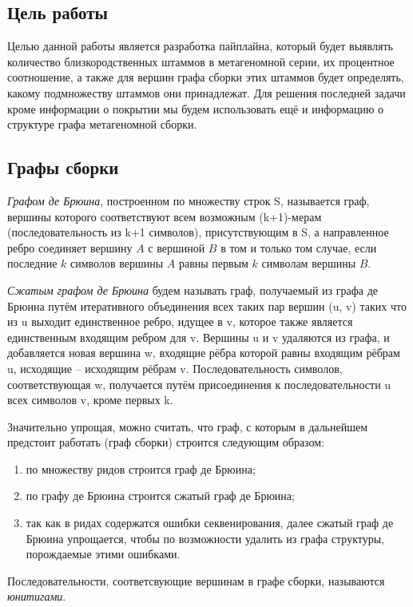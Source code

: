 \documentclass{spbau-diploma}
\begin{document}
\subsection{Цель работы}
Целью данной работы является разработка пайплайна, который будет выявлять количество близкородственных штаммов в метагеномной серии, их процентное соотношение, а также для вершин графа сборки этих штаммов будет определять, какому подмножеству штаммов они принадлежат. 
Для решения последней задачи кроме информации о покрытии мы будем использовать ещё и информацию о структуре графа метагеномной сборки. 

\subsection{Графы сборки}

\textit{Графом де Брюина}, построенном по множеству строк S, называется граф, вершины которого соответствуют всем возможным (k+1)-мерам (последовательность из k+1 символов), присутствующим в S, а направленное ребро соединяет вершину $A$ с вершиной $B$ в том и только том случае, если последние $k$ символов вершины $A$ равны первым $k$ символам вершины $B$.

\textit{Сжатым графом де Брюина} будем называть граф, получаемый из графа де Брюина путём итеративного объединения всех таких пар вершин (u, v) таких что из u выходит единственное ребро, идущее в v, которое также является единственным входящим ребром для v. Вершины u и v удаляются из графа, и добавляется новая вершина w, входящие рёбра которой равны входящим рёбрам u, исходящие -- исходящим рёбрам v. Последовательность символов, соответствующая w, получается путём присоединения к последовательности u всех символов v, кроме первых k.

Значительно упрощая, можно считать, что граф, с которым в дальнейшем предстоит работать (граф сборки) строится 
следующим образом:
\begin{enumerate}
    \item по множеству ридов строится граф де Брюина;
    \item по графу де Брюина строится сжатый граф де Брюина;
    \item так как в ридах содержатся ошибки секвенирования, далее сжатый граф де Брюина упрощается, чтобы по возможности удалить из графа структуры, порождаемые этими ошибками.
\end{enumerate}
Последовательности, соответсвующие вершинам в графе сборки, называются \textit{юнитигами}.
\end{document}
